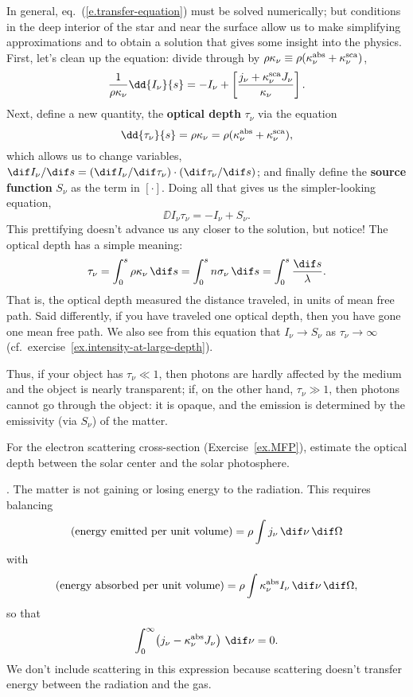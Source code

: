 In general, eq.~(\ref{e.transfer-equation}) must be solved numerically; but conditions in the deep interior of the star and near the surface allow us to make simplifying approximations and to obtain a solution that gives some insight into the physics. First, let's clean up the equation: divide through by $\rho\kappa_{\nu}\equiv\rho(\kappa_\nu^{\mathrm{abs}} + \kappa_\nu^{\mathrm{sca}})$,
\[
	\frac{1}{\rho\kappa_{\nu}}\dd{I_{\nu}}{s} = -I_{\nu} + \left[\frac{j_{\nu} + \kapscat J_{\nu}}{\kappa_{\nu}}\right].
\]
Next, define a new quantity, the \textbf{optical depth} $\tau_{\nu}$ via the equation
\[
	\dd{\tau_{\nu}}{s} = \rho\kappa_{\nu} = \rho(\kapabs+\kapscat),
\]
which allows us to change variables, $\dif I_{\nu}/\dif s = (\dif I_{\nu}/\dif\tau_{\nu})\cdot(\dif\tau_{\nu}/\dif s)$; and finally define the \textbf{source function} $S_{\nu}$ as the term in $\left[\cdot\right]$. Doing all that gives us the simpler-looking equation,
\[
	\DD{I_{\nu}}{\tau_{\nu}} = -I_{\nu} + S_{\nu}.
\]
This prettifying doesn't advance us any closer to the solution, but notice! The optical depth has a simple meaning:
\[
	\tau_{\nu} = \int_{0}^{s} \rho\kappa_{\nu}\,\dif s = \int_{0}^{s} n\sigma_{\nu}\,\dif s = \int_{0}^{s} \frac{\dif s}{\lambda}.
\]
That is, the optical depth measured the distance traveled, in units of mean free path. Said differently, if you have traveled one optical depth, then you have gone one mean free path. We also see from this equation that $I_{\nu}\to S_{\nu}$ as $\tau_{\nu}\to\infty$ (cf.\ exercise~\ref{ex.intensity-at-large-depth}).

Thus, if your object has $\tau_{\nu}\ll 1$, then photons are hardly affected by the medium and the object is nearly transparent; if, on the other hand, $\tau_{\nu} \gg 1$, then photons cannot go through the object: it is opaque, and the emission is determined by the emissivity (via $S_{\nu}$) of the matter.

\begin{exercisebox}
For the electron scattering cross-section (Exercise~\ref{ex.MFP}), estimate the optical depth between the solar center and the solar photosphere.
\end{exercisebox}

. 
The matter is not gaining or losing energy to the radiation. This requires balancing
\[ \left(\textrm{energy emitted per unit volume}\right) = \rho\int j_{\nu}\,\dif\nu\,\dif\Omega\] 
with
\[ \left(\textrm{energy absorbed per unit volume}\right) = \rho\int \kapabs I_{\nu}\,\dif\nu\,\dif\Omega,\]
so that
\begin{equation}\label{e.rad-equil}
\int_{0}^{\infty}\! \left(j_{\nu} - \kapabs J_{\nu}\right)\,\dif\nu = 0.
\end{equation}
We don't include scattering in this expression because scattering doesn't transfer energy between the radiation and the gas.

